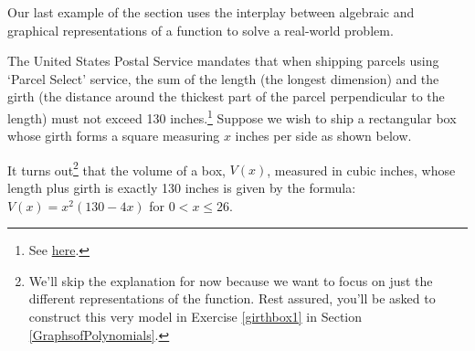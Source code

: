 \documentclass{ximera}
\begin{document}
\begin{example}



\end{example}

Our last example of the section uses the interplay between algebraic and graphical representations of a function to solve a real-world problem.

\begin{example} \label{volumeex1}    The United States Postal Service mandates that when shipping parcels using `Parcel Select' service,  the sum of the length (the longest dimension) and the girth (the distance around the thickest part of the parcel perpendicular to the length) must not exceed 130 inches.\footnote{See \href{http://pe.usps.com/text/qsg300/Q201e.htm}{{here}}.}  Suppose we wish to ship a rectangular box whose girth forms a square measuring $x$ inches per side as shown below.




It turns out\footnote{We'll skip the explanation for now because we want to focus on just the different representations of the function. Rest assured, you'll be asked to construct this very model in Exercise \ref{girthbox1} in Section \ref{GraphsofPolynomials}.} that the volume of a box, $V(x)$, measured in cubic inches,  whose length plus girth is exactly 130 inches is given by the formula: $V(x) = x^2 (130-4x)$ for $0 < x \leq 26$.

 

\begin{enumerate}


\end{enumerate}
\end{example}
\end{document}
